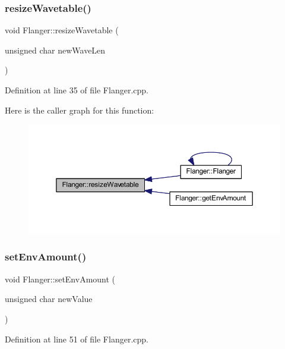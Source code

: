 \subsubsection{\texorpdfstring{resize\+Wavetable()}{resizeWavetable()}}
{\footnotesize\ttfamily void Flanger\+::resize\+Wavetable (\begin{DoxyParamCaption}\item[{unsigned char}]{new\+Wave\+Len }\end{DoxyParamCaption})}



Definition at line 35 of file Flanger.\+cpp.

Here is the caller graph for this function\+:
\nopagebreak
\begin{figure}[H]
\begin{center}
\leavevmode
\includegraphics[width=350pt]{d5/d64/class_flanger_a382a9889299da650998fe547dd859c5f_icgraph}
\end{center}
\end{figure}
\mbox{\label{class_flanger_ac4f38ebccacae85c724fe43f13caf636}} 
\subsubsection{\texorpdfstring{set\+Env\+Amount()}{setEnvAmount()}}
{\footnotesize\ttfamily void Flanger\+::set\+Env\+Amount (\begin{DoxyParamCaption}\item[{unsigned char}]{new\+Value }\end{DoxyParamCaption})}



Definition at line 51 of file Flanger.\+cpp.

